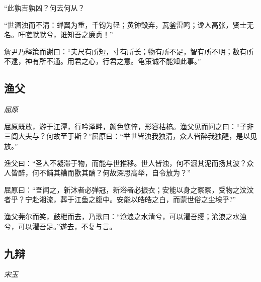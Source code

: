 \documentclass[]{article}
\begin{document}
``此孰吉孰凶？何去何从？

``世溷浊而不清：蝉翼为重，千钧为轻；黄钟毁弃，瓦釜雷鸣；谗人高张，贤士无名。吁嗟默默兮，谁知吾之廉贞！''

詹尹乃释策而谢曰：``夫尺有所短，寸有所长；物有所不足，智有所不明；数有所不逮，神有所不通。用君之心，行君之意。龟策诚不能知此事。''

\hypertarget{header-n148}{%
\subsection{渔父}\label{header-n148}}

\emph{屈原}

屈原既放，游于江潭，行吟泽畔，颜色憔悴，形容枯槁。渔父见而问之曰：``子非三闾大夫与？何故至于斯？''屈原曰：``举世皆浊我独清，众人皆醉我独醒，是以见放。''

渔父曰：``圣人不凝滞于物，而能与世推移。世人皆浊，何不淈其泥而扬其波？众人皆醉，何不餔其糟而歠其醨？何故深思高举，自令放为？''

屈原曰：``吾闻之，新沐者必弹冠，新浴者必振衣；安能以身之察察，受物之汶汶者乎？宁赴湘流，葬于江鱼之腹中。安能以皓皓之白，而蒙世俗之尘埃乎?''

渔父莞尔而笑，鼓枻而去，乃歌曰：``沧浪之水清兮，可以濯吾缨；沧浪之水浊兮，可以濯吾足。''遂去，不复与言。

\hypertarget{header-n156}{%
\subsection{九辩}\label{header-n156}}

\emph{宋玉}
\end{document}
